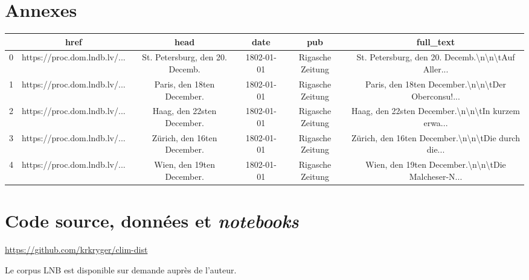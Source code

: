 \documentclass[a4paper,twoside,12pt]{article}
\begin{document}
\section*{Annexes}


\vspace{1ex}
\begin{tabularx}{\textwidth}{l@{\hspace{4pt}}*{5}{c}}\\
\toprule
{} &                                               href &                             head &        date &               pub &                                          full\_text \\
\midrule
0 &  https://proc.dom.lndb.lv/... &  St. Petersburg, den 20. Decemb. &  1802-01-01 &  Rigasche Zeitung &  St. Petersburg, den 20. Decemb.\textbackslash n\textbackslash n\textbackslash tAuf Aller... \\
1 &  https://proc.dom.lndb.lv/... &       Paris, den 18ten December. &  1802-01-01 &  Rigasche Zeitung &  Paris, den 18ten December.\textbackslash n\textbackslash n\textbackslash tDer Oberconsu!... \\
2 &  https://proc.dom.lndb.lv/... &       Haag, den 22sten December. &  1802-01-01 &  Rigasche Zeitung &  Haag, den 22sten December.\textbackslash n\textbackslash n\textbackslash tIn kurzem erwa... \\
3 &  https://proc.dom.lndb.lv/... &      Zürich, den 16ten December. &  1802-01-01 &  Rigasche Zeitung &  Zürich, den 16ten December.\textbackslash n\textbackslash n\textbackslash tDie durch die... \\
4 &  https://proc.dom.lndb.lv/... &        Wien, den 19ten December. &  1802-01-01 &  Rigasche Zeitung &  Wien, den 19ten December.\textbackslash n\textbackslash n\textbackslash tDie Malcheser-N... \\
\bottomrule
\end{tabularx}
\vspace{1ex}



\section*{Code source, données et \textit{notebooks}}

\url{https://github.com/krkryger/clim-dist}

Le corpus LNB est disponible sur demande auprès de l'auteur.

\printbibliography

\listoffigures
\clearpage

\tableofcontents
\end{document}
